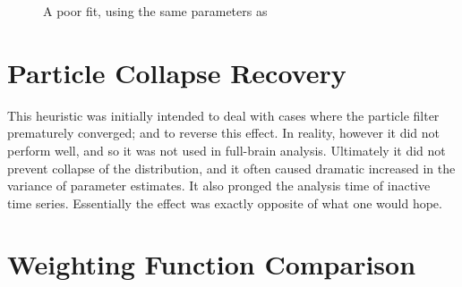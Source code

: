 \begin{figure}
\label{fig:param2_var}
\caption{A poor fit, using the same parameters as }
\end{figure}

\section{Particle Collapse Recovery}
This heuristic was initially intended to deal with cases where the particle
filter prematurely converged; and to reverse this effect. In reality, however
it did not perform well, and so it was not used in full-brain analysis. Ultimately
it did not prevent collapse of the distribution, and it often caused dramatic
increased in the variance of parameter estimates. It also pronged the analysis
time of inactive time series. Essentially the effect was exactly opposite of what
one would hope.


\section{Weighting Function Comparison}
\label{sec:Results Weights}

